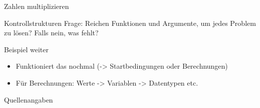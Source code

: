 \documentclass[aspectratio=169,t]{beamer}
\begin{document}
\begin{frame}{Zahlen multiplizieren}
\end{frame}

\begin{frame}{Kontrollstrukturen}
	Frage: Reichen Funktionen und Argumente, um jedes Problem zu lösen? Falls nein, was fehlt?
\end{frame}

\begin{frame}{Beispiel weiter}
	\begin{itemize}
		\item Funktioniert das nochmal (-> Startbedingungen oder Berechnungen)
		\item Für Berechnungen: Werte -> Variablen -> Datentypen etc.
	\end{itemize}
\end{frame}

\begin{frame}[allowframebreaks]{Quellenangaben}
    \printbibliography
\end{frame}


\end{document}
